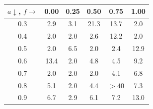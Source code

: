 \begin{tabular}{c|ccccc}
\toprule
$a \downarrow$, $f \rightarrow$ & 0.00 & 0.25 & 0.50 & 0.75 & 1.00 \\
\midrule
0.3 & 2.9 & 3.1 & 21.3 & 13.7 & 2.0 \\
0.4 & 2.0 & 2.0 & 2.6 & 12.2 & 2.0 \\
0.5 & 2.0 & 6.5 & 2.0 & 2.4 & 12.9 \\
0.6 & 13.4 & 2.0 & 4.8 & 4.5 & 9.2 \\
0.7 & 2.0 & 2.0 & 2.0 & 4.1 & 6.8 \\
0.8 & 5.1 & 2.0 & 4.4 & $>40$ & 7.3 \\
0.9 & 6.7 & 2.9 & 6.1 & 7.2 & 13.0 \\
\bottomrule
\end{tabular}